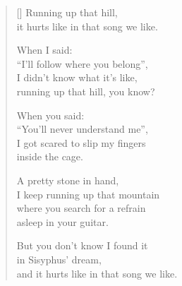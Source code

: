 \documentclass[12pt,a4paper]{article}
\begin{document}
\thispagestyle{empty}


\settowidth{\versewidth}{But it's all cages and enclosures}

\bigskip

\begin{verse}[\versewidth]
  Running up that hill, \\
  it hurts like in that song we like.

  When I said: \\
  ``I'll follow where you belong'', \\
  I didn't know what it's like, \\
  running up that hill, you know?

  When you said: \\
  ``You'll never understand me'', \\
  I got scared to slip my fingers \\
  inside the cage.

  A pretty stone in hand, \\
  I keep running up that mountain \\
  where you search for a refrain \\
  asleep in your guitar.

  But you don't know I found it \\
  in Sisyphus' dream, \\
  and it hurts like in that song  we like.
\end{verse}
\end{document}
